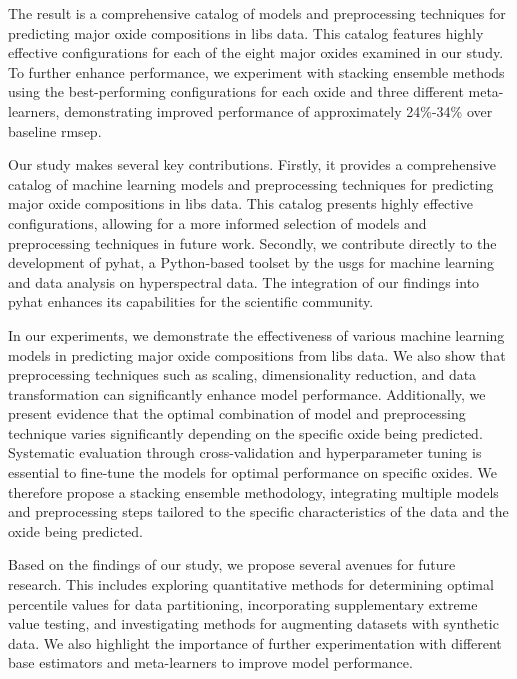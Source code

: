 \vspace{0.5em}

The result is a comprehensive catalog of models and preprocessing techniques for predicting major oxide compositions in \gls{libs} data.
This catalog features highly effective configurations for each of the eight major oxides examined in our study.
To further enhance performance, we experiment with stacking ensemble methods using the best-performing configurations for each oxide and three different meta-learners, demonstrating improved performance of approximately 24\%-34\% over baseline \gls{rmsep}.

\vspace{0.5em}

Our study makes several key contributions.
Firstly, it provides a comprehensive catalog of machine learning models and preprocessing techniques for predicting major oxide compositions in \gls{libs} data.
This catalog presents highly effective configurations, allowing for a more informed selection of models and preprocessing techniques in future work.
Secondly, we contribute directly to the development of \gls{pyhat}, a Python-based toolset by the \gls{usgs} for machine learning and data analysis on hyperspectral data.
The integration of our findings into \gls{pyhat} enhances its capabilities for the scientific community.

\vspace{0.5em}

In our experiments, we demonstrate the effectiveness of various machine learning models in predicting major oxide compositions from \gls{libs} data.
We also show that preprocessing techniques such as scaling, dimensionality reduction, and data transformation can significantly enhance model performance.
Additionally, we present evidence that the optimal combination of model and preprocessing technique varies significantly depending on the specific oxide being predicted.
Systematic evaluation through cross-validation and hyperparameter tuning is essential to fine-tune the models for optimal performance on specific oxides.
We therefore propose a stacking ensemble methodology, integrating multiple models and preprocessing steps tailored to the specific characteristics of the data and the oxide being predicted.

\vspace{0.5em}

Based on the findings of our study, we propose several avenues for future research.
This includes exploring quantitative methods for determining optimal percentile values for data partitioning, incorporating supplementary extreme value testing, and investigating methods for augmenting datasets with synthetic data.
We also highlight the importance of further experimentation with different base estimators and meta-learners to improve model performance.

\glsresetall